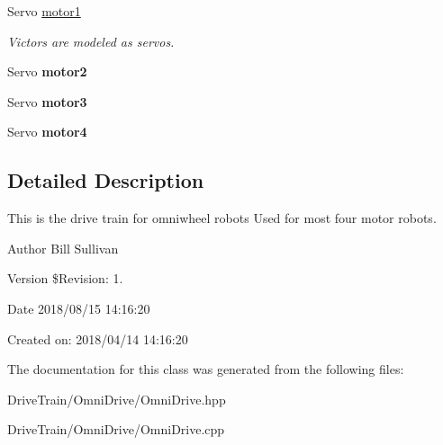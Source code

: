 \begin{DoxyCompactItemize}
Servo \mbox{\hyperlink{class_omni_drive_conrtoller_a8386f67e9931ac191335c14c4b56bbda}{motor1}}
\begin{DoxyCompactList}\small\item\em Victors are modeled as servos. \end{DoxyCompactList}\item 
\mbox{\label{class_omni_drive_conrtoller_aa4a56af43aad703ade2854b5a544c570}} 
Servo {\bfseries motor2}
\item 
\mbox{\label{class_omni_drive_conrtoller_a28f94aa752f0fd8cd7de271d68c8cfe1}} 
Servo {\bfseries motor3}
\item 
\mbox{\label{class_omni_drive_conrtoller_a80bdd6e6a723aa9e101f738b6c35462f}} 
Servo {\bfseries motor4}
\end{DoxyCompactItemize}


\subsection{Detailed Description}
This is the drive train for omniwheel robots Used for most four motor robots. 

\begin{DoxyAuthor}{Author}
Bill Sullivan
\end{DoxyAuthor}
\begin{DoxyVersion}{Version}
\$\+Revision\+: 1.
\end{DoxyVersion}
\begin{DoxyDate}{Date}
2018/08/15 14\+:16\+:20
\end{DoxyDate}
Created on\+: 2018/04/14 14\+:16\+:20 

The documentation for this class was generated from the following files\+:\begin{DoxyCompactItemize}
\item 
Drive\+Train/\+Omni\+Drive/Omni\+Drive.\+hpp\item 
Drive\+Train/\+Omni\+Drive/Omni\+Drive.\+cpp\end{DoxyCompactItemize}
